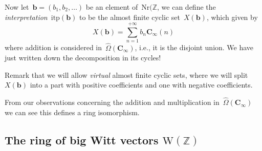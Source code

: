 Now let~$\mathbf{b}=(b_1,b_2,\ldots)$ be an element of~$\mathrm{Nr}(\mathbb{Z}$, we can define the \emph{interpretation}~$\mathrm{itp}(\mathbf{b})$ to be the almost finite cyclic set~$X(\mathbf{b})$, which given by
\begin{equation}
  X(\mathbf{b})=\sum_{n=1}^{+\infty}b_n\mathbf{C}_\infty(n)
\end{equation}
where addition is considered in~$\hat{\Omega}(\mathbf{C}_\infty)$, i.e., it is the disjoint union. We have just written down the decomposition in its cycles!

Remark that we will allow \emph{virtual} almost finite cyclic sets, where we will split~$X(\mathbf{b})$ into a part with positive coefficients and one with negative coefficients.

From our observations concerning the addition and multiplication in~$\hat{\Omega}(\mathbf{C}_\infty)$ we can see this defines a ring isomorphism.


\subsection{The ring of big Witt vectors $\mathrm{W}(\mathbb{Z})$}
